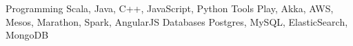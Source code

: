 \begin{cvskills}
  \cvskill
    {Programming}
    {Scala, Java, C++, JavaScript, Python}
  \cvskill
    {Tools}
    {Play, Akka, AWS, Mesos, Marathon, Spark, AngularJS}
  \cvskill
    {Databases}
    {Postgres, MySQL, ElasticSearch, MongoDB}
\end{cvskills}
